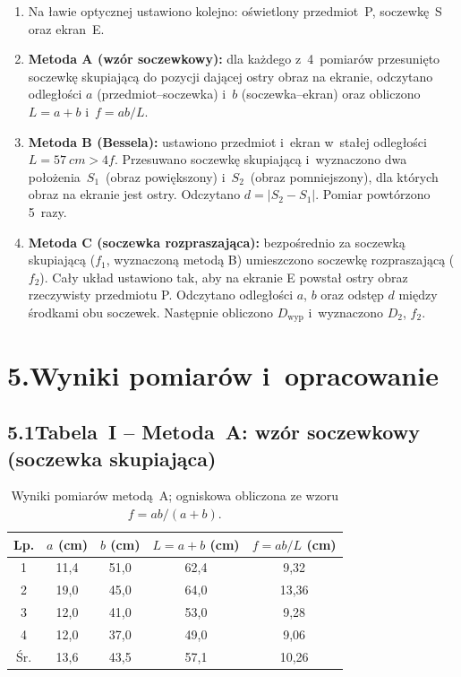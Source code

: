 \documentclass[a4paper,12pt]{article}
\begin{document}
\begin{enumerate}
  \item Na ławie optycznej ustawiono kolejno: oświetlony przedmiot~P, soczewkę~S
        oraz ekran~E.

  \item \textbf{Metoda A (wzór soczewkowy):} dla każdego z~4~pomiarów przesunięto
        soczewkę skupiającą do pozycji dającej ostry obraz na ekranie, odczytano
        odległości $a$ (przedmiot--soczewka) i~$b$ (soczewka--ekran) oraz obliczono
        $L = a + b$ i~$f = ab/L$.

  \item \textbf{Metoda B (Bessela):} ustawiono przedmiot i~ekran w~stałej odległości
        $L = \SI{57}{cm} > 4f$. Przesuwano soczewkę skupiającą i~wyznaczono dwa
        położenia~$S_1$~(obraz powiększony) i~$S_2$~(obraz pomniejszony), dla których
        obraz na ekranie jest ostry. Odczytano $d = |S_2 - S_1|$.
        Pomiar powtórzono 5~razy.

  \item \textbf{Metoda C (soczewka rozpraszająca):} bezpośrednio za soczewką skupiającą
        ($f_1$, wyznaczoną metodą B) umieszczono soczewkę rozpraszającą ($f_2$).
        Cały układ ustawiono tak, aby na ekranie E powstał ostry obraz rzeczywisty
        przedmiotu P. Odczytano odległości $a$, $b$ oraz odstęp $d$ między środkami
        obu soczewek. Następnie obliczono $D_\text{wyp}$ i~wyznaczono $D_2$, $f_2$.
\end{enumerate}

\section*{5.\quad Wyniki pomiarów i~opracowanie}

\subsection*{5.1\quad Tabela~I – Metoda~A: wzór soczewkowy (soczewka skupiająca)}

\begin{table}[H]
\centering
\caption{Wyniki pomiarów metodą~A; ogniskowa obliczona ze wzoru $f = ab/(a+b)$.}
\label{tab:A}
\renewcommand{\arraystretch}{1.25}
\begin{tabular}{c
    S[table-format=2.1]
    S[table-format=2.1]
    S[table-format=2.1]
    S[table-format=2.2]}
\toprule
Lp. & {$a$ (cm)} & {$b$ (cm)} & {$L = a+b$ (cm)} & {$f = ab/L$ (cm)} \\
 & 11,4 & 51,0 & 62,4 &  9,32 \\
2 & 19,0 & 45,0 & 64,0 & 13,36 \\
3 & 12,0 & 41,0 & 53,0 &  9,28 \\
4 & 12,0 & 37,0 & 49,0 &  9,06 \\
\midrule
Śr. & 13,6 & 43,5 & 57,1 & 10,26 \\
\bottomrule
\end{tabular}
\end{table}
\end{document}
